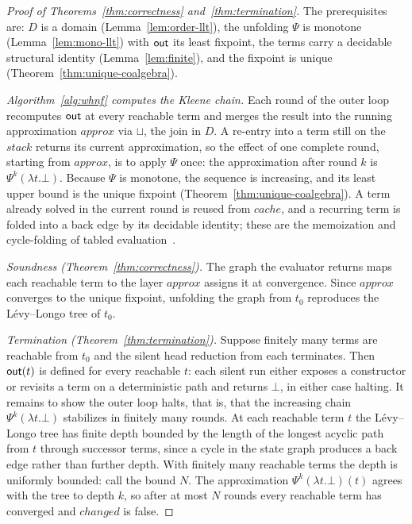 \begin{proof}[Proof of Theorems~\ref{thm:correctness} and~\ref{thm:termination}]
  The prerequisites are: $D$ is a domain (Lemma~\ref{lem:order-llt}), the unfolding $\Psi$ is monotone (Lemma~\ref{lem:mono-llt}) with $\mathsf{out}$ its least fixpoint, the terms carry a decidable structural identity (Lemma~\ref{lem:finite}), and the fixpoint is unique (Theorem~\ref{thm:unique-coalgebra}).

  \emph{Algorithm~\ref{alg:whnf} computes the Kleene chain.} Each round of the outer loop recomputes $\mathsf{out}$ at every reachable term and merges the result into the running approximation $\mathit{approx}$ via $\sqcup$, the join in $D$. A re-entry into a term still on the $\mathit{stack}$ returns its current approximation, so the effect of one complete round, starting from $\mathit{approx}$, is to apply $\Psi$ once: the approximation after round $k$ is $\Psi^k(\lambda t.\bot)$. Because $\Psi$ is monotone, the sequence is increasing, and its least upper bound is the unique fixpoint (Theorem~\ref{thm:unique-coalgebra}). A term already solved in the current round is reused from $\mathit{cache}$, and a recurring term is folded into a back edge by its decidable identity; these are the memoization and cycle-folding of tabled evaluation~\cite{vanemden-kowalski, tamaki-sato, tabling-slg}.

  \emph{Soundness (Theorem~\ref{thm:correctness}).} The graph the evaluator returns maps each reachable term to the layer $\mathit{approx}$ assigns it at convergence. Since $\mathit{approx}$ converges to the unique fixpoint, unfolding the graph from $t_0$ reproduces the L\'evy--Longo tree of $t_0$.

  \emph{Termination (Theorem~\ref{thm:termination}).} Suppose finitely many terms are reachable from $t_0$ and the silent head reduction from each terminates. Then $\mathsf{out}(t)$ is defined for every reachable $t$: each silent run either exposes a constructor or revisits a term on a deterministic path and returns $\bot$, in either case halting. It remains to show the outer loop halts, that is, that the increasing chain $\Psi^k(\lambda t.\bot)$ stabilizes in finitely many rounds. At each reachable term $t$ the L\'evy--Longo tree has finite depth bounded by the length of the longest acyclic path from $t$ through successor terms, since a cycle in the state graph produces a back edge rather than further depth. With finitely many reachable terms the depth is uniformly bounded: call the bound $N$. The approximation $\Psi^k(\lambda t.\bot)(t)$ agrees with the tree to depth $k$, so after at most $N$ rounds every reachable term has converged and $\mathit{changed}$ is false.
\end{proof}

